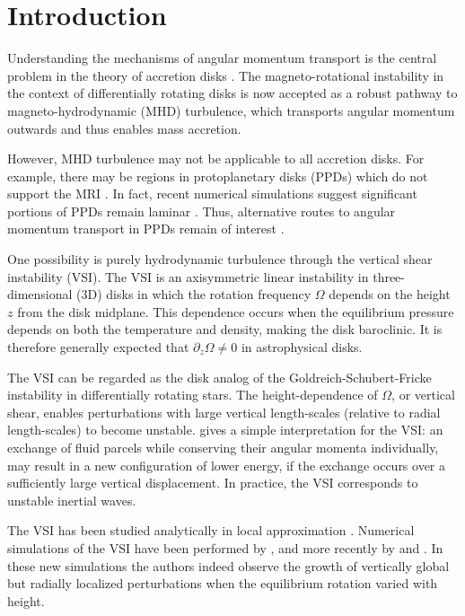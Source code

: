 \documentclass[iop]{emulateapj}
\newcommand{\p}{\partial}
\begin{document}
\section{Introduction}
Understanding the mechanisms of angular momentum transport is the
central problem in the theory of accretion disks 
\citep{lyndenbell74}. The   
magneto-rotational instability in the context of differentially
rotating disks \citep[MRI,][]{balbus91} is now accepted as a robust
pathway to magneto-hydrodynamic (MHD) turbulence, which transports
angular momentum outwards and thus enables mass accretion. 

However, MHD turbulence may not be applicable to all  
accretion disks. For example, there may be regions in protoplanetary  
disks (PPDs) which do not support the MRI 
\citep{gammie96,landry13}. In fact, recent  numerical simulations
suggest significant portions of PPDs remain laminar \citep[e.g.][and references
therein]{lesur14,bai15,gressel15}. Thus, alternative routes 
to angular momentum transport in PPDs remain of interest
\citep{armitage10}. 
 
One possibility is purely hydrodynamic turbulence through the vertical
shear instability (VSI). The VSI is an axisymmetric linear instability
in three-dimensional (3D) disks in which the rotation frequency
$\Omega$ depends on the height $z$ from the disk midplane. This
dependence occurs when the equilibrium pressure depends on both the
temperature and density, making the disk baroclinic. It is therefore
generally expected that $\p_z\Omega\neq 0$ in astrophysical disks.  

The VSI can be regarded as the disk analog of the
Goldreich-Schubert-Fricke instability 
\citep[GSF,][]{goldreich67,fricke68} in differentially rotating stars.   
The height-dependence of $\Omega$, or vertical shear, enables
perturbations with large vertical length-scales (relative to radial 
length-scales) to become unstable. \cite{umurhan13} gives a simple
interpretation for the VSI: an exchange of fluid parcels while
conserving their angular momenta individually, may result in a new
configuration of lower energy, if the exchange occurs over a
sufficiently large vertical displacement. In practice, the VSI
corresponds to unstable inertial waves.  

The VSI has been studied analytically in local approximation
\citep{urpin98,urpin03}.  Numerical simulations of the  
VSI have been performed by \cite{arlt04}, and more recently by 
\cite{nelson13} and \cite{stoll14}. In these new simulations the authors
indeed observe the growth of vertically global but radially localized
perturbations when the equilibrium rotation varied with height.   
\end{document}
